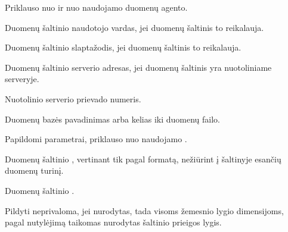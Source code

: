 \documentclass[letterpaper,10pt,lithuanian]{sphinxmanual}
\begin{document}
\begin{fulllineitems}
\begin{description}
\sphinxAtStartPar
Priklauso nuo  ir nuo naudojamo duomenų agento.

\sphinxAtStartPar
Duomenų šaltinio naudotojo vardas, jei duomenų šaltinis to reikalauja.

\sphinxAtStartPar
Duomenų šaltinio slaptažodis, jei duomenų šaltinis to reikalauja.

\sphinxAtStartPar
Duomenų šaltinio serverio adresas, jei duomenų šaltinis yra
nuotoliniame serveryje.

\sphinxAtStartPar
Nuotolinio serverio prievado numeris.

\sphinxAtStartPar
Duomenų bazės pavadinimas arba kelias iki duomenų failo.

\sphinxAtStartPar
Papildomi parametrai, priklauso nuo naudojamo .

\end{description}

\end{fulllineitems}


\begin{fulllineitems}
\label{\detokenize{dimensijos:resource.level}}
\pysigstartsignatures
{}
\pysigstopsignatures
\sphinxAtStartPar
Duomenų šaltinio {\hyperref[\detokenize{branda:level}]{}}, vertinant tik pagal formatą,
nežiūrint į šaltinyje esančių duomenų turinį.

\end{fulllineitems}


\begin{fulllineitems}
\label{\detokenize{dimensijos:resource.access}}
\pysigstartsignatures
{}
\pysigstopsignatures
\sphinxAtStartPar
Duomenų šaltinio {\hyperref[\detokenize{prieiga:access}]{}}.

\sphinxAtStartPar
Pildyti neprivaloma, jei nurodytas, tada visoms žemesnio lygio dimensijoms,
pagal nutylėjimą taikomas nurodytas šaltinio prieigos lygis.

\end{fulllineitems}
\end{document}
